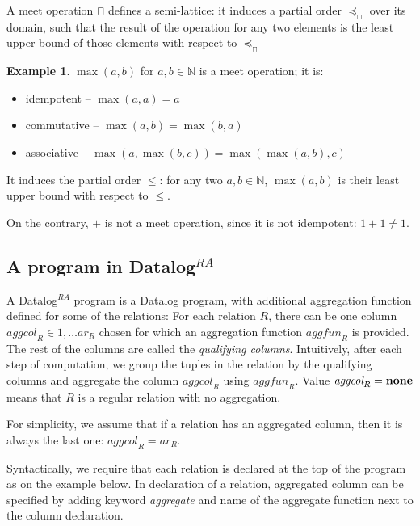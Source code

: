\documentclass{pracamgr}
\theoremstyle{plain}
\theoremstyle{definition}
\newtheorem{exmp}{Example}[section]
\theoremstyle{remark}
\newcommand{\datalogra}{Datalog$^{RA}$ }
\newcommand{\aggfun}{\textit{aggfun} }
\newcommand{\aggcol}{\textit{aggcol} }
\begin{document}
A meet operation $\sqcap$ defines a semi-lattice: it induces a partial order $\preceq_\sqcap$ over its domain, such that the result of the operation for any two elements is the least upper bound of those elements with respect to $\preceq_\sqcap$

\begin{exmp}
$\max(a, b)$ for $a, b \in \mathbb{N}$ is a meet operation; it is:
\begin{itemize}
\item idempotent -- $\max(a, a) = a$
\item commutative -- $\max(a, b) = \max(b, a)$
\item associative -- $\max(a, \max(b, c)) = \max(\max(a, b), c)$
\end{itemize}
It induces the partial order $\le$: for any two $a, b \in \mathbb{N}$, $\max(a, b)$ is their least upper bound with respect to $\le$.


On the contrary, $+$ is not a meet operation, since it is not idempotent: $1+1 \ne 1$.
\end{exmp}

\subsection{A program in \datalogra}
A \datalogra program is a Datalog program, with additional aggregation function defined for some of the relations:
For each relation $R$, there can be one column $\aggcol_R \in {1, \dots ar_R}$ chosen for which an aggregation function $\aggfun_R$ is provided. The rest of the columns are called the \emph{qualifying columns}. Intuitively, after each step of computation, we group the tuples in the relation by the qualifying columns and aggregate the column $\aggcol_R$ using $\aggfun_R$. Value $\aggcol_R = \bf{none}$ means that $R$ is a regular relation with no aggregation.

For simplicity, we assume that if a relation has an aggregated column, then it is always the last one: $\aggcol_R = ar_R$.

Syntactically, we require that each relation is declared at the top of the program as on the example below. In declaration of a relation, aggregated column can be specified by adding keyword \textit{aggregate} and name of the aggregate function next to the column declaration.
\end{document}
